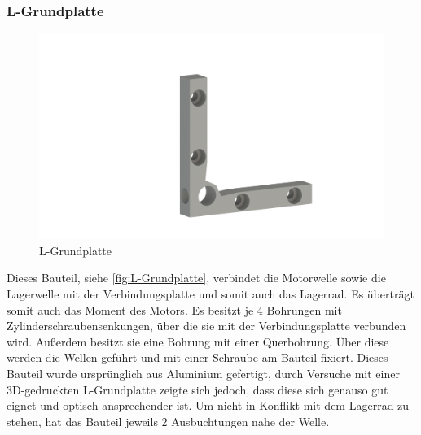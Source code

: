 \subsubsection{L-Grundplatte}
\begin{figure}
    \includegraphics[width=8 cm]{fig/mech/L_Grundplatte}
    \caption{L-Grundplatte}
    \label{fig:L-Grundplatte}
\end{figure}
Dieses Bauteil, siehe \autoref{fig:L-Grundplatte}, verbindet die Motorwelle sowie die Lagerwelle mit der Verbindungsplatte und somit auch das Lagerrad.
Es überträgt somit auch das Moment des Motors. Es besitzt je 4 Bohrungen mit Zylinderschraubensenkungen, über die sie mit
der Verbindungsplatte verbunden wird. Außerdem besitzt sie eine Bohrung mit einer Querbohrung. Über diese werden die
Wellen geführt und mit einer Schraube am Bauteil fixiert.
Dieses Bauteil wurde ursprünglich aus Aluminium gefertigt, durch Versuche mit einer 3D-gedruckten L-Grundplatte zeigte
sich jedoch, dass diese sich genauso gut eignet und optisch ansprechender ist. Um nicht in Konflikt mit dem Lagerrad
zu stehen, hat das Bauteil jeweils 2 Ausbuchtungen nahe der Welle.

